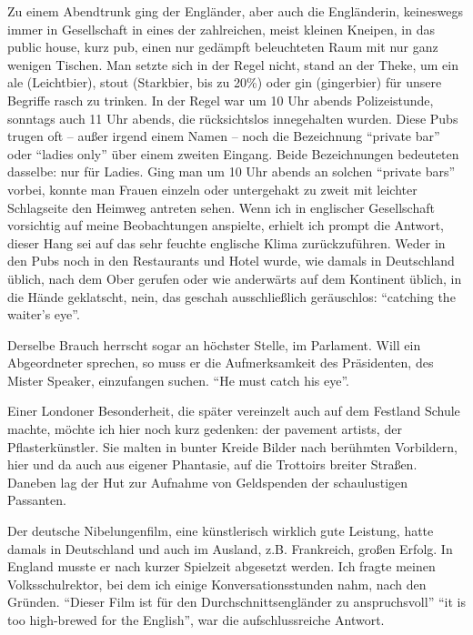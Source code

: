 \documentclass[a5paper,pagesize,10pt,twoside=true]{scrbook}
\renewcommand{\marginpar}[2][]{}
\begin{document}
Zu einem Abendtrunk ging der Engländer, aber auch die Engländerin, keineswegs immer in Gesellschaft in eines der zahlreichen, meist kleinen Kneipen, in das public house, kurz pub, einen nur gedämpft beleuchteten Raum mit nur ganz wenigen Tischen. Man setzte sich in der Regel nicht, stand an der Theke, um ein ale (Leichtbier), stout (Starkbier, bis zu 20\%) oder gin (gingerbier) für unsere Begriffe rasch zu trinken. In der Regel war um 10 Uhr abends Polizeistunde, sonntags auch 11 Uhr abends, die rücksichtslos innegehalten wurden. Diese Pubs trugen oft -- außer irgend einem Namen -- noch die Bezeichnung \enquote{private bar} oder \enquote{ladies only} über einem zweiten Eingang. Beide Bezeichnungen bedeuteten dasselbe: nur für Ladies. Ging man um 10 Uhr abends an solchen \enquote{private bars} vorbei, konnte man Frauen einzeln oder untergehakt zu zweit mit leichter Schlagseite den Heimweg antreten sehen. Wenn ich in englischer Gesellschaft vorsichtig auf meine Beobachtungen anspielte, erhielt ich prompt die Antwort, dieser Hang sei auf das sehr feuchte englische Klima zurückzuführen. Weder in den Pubs noch in den Restaurants und Hotel wurde, wie damals in Deutschland üblich, nach dem Ober gerufen oder wie anderwärts auf dem Kontinent üblich, in die Hände geklatscht, nein, das geschah ausschließlich geräuschlos: \enquote{catching the waiter's eye}.

Derselbe Brauch herrscht sogar an höchster Stelle, im Parlament. Will ein Abgeordneter sprechen, so muss er die Aufmerksamkeit des Präsidenten, des Mister Speaker, einzufangen suchen. \enquote{He must catch his eye}.

\marginpar{507}
Einer Londoner Besonderheit, die später vereinzelt auch auf dem Festland Schule machte, möchte ich hier noch kurz gedenken: der pavement artists, der Pflasterkünstler. Sie malten in bunter Kreide Bilder nach berühmten Vorbildern, hier und da auch aus eigener Phantasie, auf die Trottoirs breiter Straßen. Daneben lag der Hut zur Aufnahme von Geldspenden der schaulustigen Passanten.

Der deutsche Nibelungenfilm, eine künstlerisch wirklich gute Leistung, hatte damals in Deutschland und auch im Ausland, z.B. Frankreich, großen Erfolg. In England musste er nach kurzer Spielzeit abgesetzt werden. Ich fragte meinen Volksschulrektor, bei dem ich einige Konversationsstunden nahm, nach den Gründen. \enquote{Dieser Film ist für den Durchschnittsengländer zu anspruchsvoll} \enquote{it is too high-brewed for the English}, war die aufschlussreiche Antwort.\\
\end{document}
